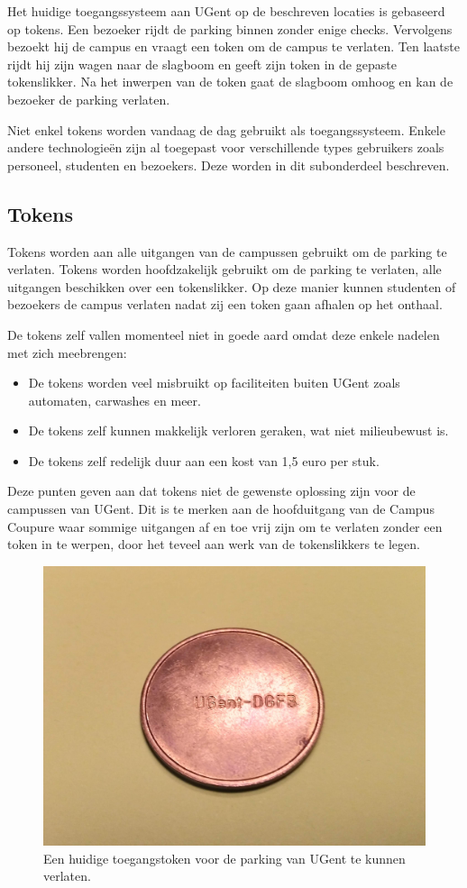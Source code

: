 Het huidige toegangssysteem aan UGent op de beschreven locaties is gebaseerd op tokens. Een bezoeker rijdt de parking binnen zonder enige checks. Vervolgens bezoekt hij de campus en vraagt een token om de campus te verlaten. Ten laatste rijdt hij zijn wagen naar de slagboom en geeft zijn token in de gepaste tokenslikker. Na het inwerpen van de token gaat de slagboom omhoog en kan de bezoeker de parking verlaten.

Niet enkel tokens worden vandaag de dag gebruikt als toegangssysteem. Enkele andere technologieën zijn al toegepast voor verschillende types gebruikers zoals personeel, studenten en bezoekers. Deze worden in dit subonderdeel beschreven.

\subsection{Tokens}

Tokens worden aan alle uitgangen van de campussen gebruikt om de parking te verlaten.
Tokens worden hoofdzakelijk gebruikt om de parking te verlaten, alle uitgangen beschikken over een tokenslikker. Op deze manier kunnen studenten of bezoekers de campus verlaten nadat zij een token gaan afhalen op het onthaal.

De tokens zelf vallen momenteel niet in goede aard omdat deze enkele nadelen met zich meebrengen:
\begin{itemize}
	\item De tokens worden veel misbruikt op faciliteiten buiten UGent zoals automaten, carwashes en meer.
	\item De tokens zelf kunnen makkelijk verloren geraken, wat niet milieubewust is.
	\item De tokens zelf redelijk duur aan een kost van 1,5 euro per stuk.
\end{itemize}

Deze punten geven aan dat tokens niet de gewenste oplossing zijn voor de campussen van UGent. Dit is te merken aan de hoofduitgang van de Campus Coupure waar sommige uitgangen af en toe vrij zijn om te verlaten zonder een token in te werpen, door het teveel aan werk van de tokenslikkers te legen.

\begin{figure}[h!]
	\centering
	\includegraphics[width=0.5\linewidth]{img/token.jpg}
	\caption{Een huidige toegangstoken voor de parking van UGent te kunnen verlaten.}
\end{figure}


